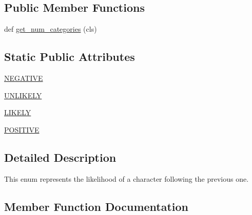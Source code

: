 \subsection*{Public Member Functions}
\begin{DoxyCompactItemize}
\item 
def \hyperlink{classpip_1_1__vendor_1_1chardet_1_1enums_1_1SequenceLikelihood_a0777f000c375d3a0096028fe9de257dc}{get\+\_\+num\+\_\+categories} (cls)
\end{DoxyCompactItemize}
\subsection*{Static Public Attributes}
\begin{DoxyCompactItemize}
\item 
\hyperlink{classpip_1_1__vendor_1_1chardet_1_1enums_1_1SequenceLikelihood_ad294b7eb16a6846aa800d152711d8e1d}{N\+E\+G\+A\+T\+I\+VE}
\item 
\hyperlink{classpip_1_1__vendor_1_1chardet_1_1enums_1_1SequenceLikelihood_a8d7c2759a0589e471103d91217d99142}{U\+N\+L\+I\+K\+E\+LY}
\item 
\hyperlink{classpip_1_1__vendor_1_1chardet_1_1enums_1_1SequenceLikelihood_a91b5300b19b98ae3a4f67da0aee2af68}{L\+I\+K\+E\+LY}
\item 
\hyperlink{classpip_1_1__vendor_1_1chardet_1_1enums_1_1SequenceLikelihood_ae8af757ec7c26e84fe239c9409664053}{P\+O\+S\+I\+T\+I\+VE}
\end{DoxyCompactItemize}


\subsection{Detailed Description}
\begin{DoxyVerb}This enum represents the likelihood of a character following the previous one.
\end{DoxyVerb}
 

\subsection{Member Function Documentation}
\mbox{\label{classpip_1_1__vendor_1_1chardet_1_1enums_1_1SequenceLikelihood_a0777f000c375d3a0096028fe9de257dc}} 
